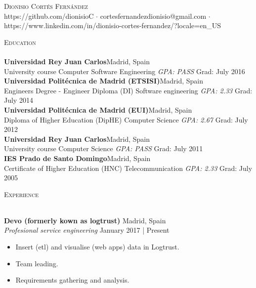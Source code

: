 \documentclass[a4paper]{article}
\newcommand{\lineunder} {
    \vspace*{-8pt} \\
    \hspace*{-18pt} \hrulefill \\
}
\newcommand{\header} [1] {
    {\hspace*{-18pt}\vspace*{6pt} \textsc{#1}}
    \vspace*{-6pt} \lineunder
}
\begin{document}
\vspace*{-40pt}

\vspace*{-10pt}
\begin{center}
	{\Huge \scshape {Dionisio Cort\'es Fern\'andez}}\\
	https://github.com/dionisioC $\cdot$ cortesfernandezdionisio@gmail.com $\cdot$ https://www.linkedin.com/in/dionisio-cortes-fernandez/?locale=en\_US\\
\end{center}

\vspace*{2mm}

\header{Education}
\textbf{Universidad Rey Juan Carlos}\hfill Madrid, Spain\\
University course Computer Software Engineering \textit{GPA: PASS} \hfill Grad: July 2016\\
\vspace{2mm}
\textbf{Universidad Polit\'ecnica de Madrid (ETSISI)}\hfill Madrid, Spain\\
Engineer\textquotesingle s Degree  - Engineer Diploma (DI) Software engineering \textit{GPA: 2.33} \hfill Grad: July 2014\\
\vspace{2mm}
\textbf{Universidad Polit\'ecnica de Madrid (EUI)}\hfill Madrid, Spain\\
Diploma of Higher Education (DipHE) Computer Science \textit{GPA: 2.67} \hfill Grad: July 2012\\
\vspace{2mm}
\textbf{Universidad Rey Juan Carlos}\hfill Madrid, Spain\\
University course Computer Science \textit{GPA: PASS} \hfill Grad: July 2011\\
\vspace{2mm}
\textbf{IES Prado de Santo Domingo}\hfill Madrid, Spain\\
Certificate of Higher Education (HNC) Telecommunication \textit{GPA: 2.33} \hfill Grad: July 2005\\
\vspace{2mm}

\vspace*{2mm}

\header{Experience}
\vspace{1mm}

\textbf{Devo (formerly kown as logtrust)} \hfill Madrid, Spain\\
\textit{Profesional service engineering} \hfill January 2017 | Present\\
\vspace{-1mm}
\begin{itemize} \itemsep 1pt
	\item Insert (etl) and visualise (web apps) data in Logtrust.
	\item Team leading.
	\item Requirements gathering and analysis.
\end{itemize}
\end{document}

